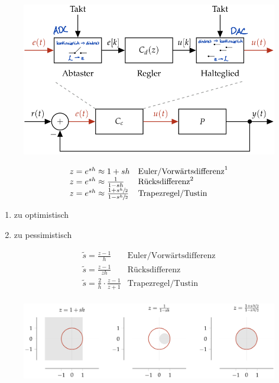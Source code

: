 \documentclass[
  10pt,
  a4paper,
  twocolumn]{article}
\providecommand{\tightlist}{%
  \setlength{\itemsep}{0pt}\setlength{\parskip}{0pt}}\usepackage{longtable,booktabs,array}
\numberwithin{equation}{section}
\begin{document}
\begin{figure}[H]

{\centering \includegraphics{images/paste-58.png}

}

\end{figure}

\[
\begin{array}{ll}
  z = e^{sh} \approx 1+sh & \text{Euler/Vorwärtsdifferenz}^1 \\
  z = e^{sh} \approx \frac1{1-sh} & \text{Rücksdifferenz}^2 \\
  z = e^{sh} \approx \frac{1+s\sfrac{h}{2}}{1-s\sfrac{h}{2}} & \text{Trapezregel/Tustin} \\
\end{array}
\]

\small

\begin{enumerate}
\def\labelenumi{\arabic{enumi}.}
\tightlist
\item
  zu optimistisch
\item
  zu pessimistisch
\end{enumerate}

\normalsize

\[
\begin{array}{ll}
  \widetilde{s} = \frac{z-1}{h} & \text{Euler/Vorwärtsdifferenz} \\
  \widetilde{s} = \frac{z-1}{zh} & \text{Rücksdifferenz} \\
  \widetilde{s} = \frac{2}{h}\cdot\frac{z-1}{z+1} & \text{Trapezregel/Tustin} \\
\end{array}
\]

\begin{figure}[H]

{\centering \includegraphics{images/paste-59.png}

}

\end{figure}
\end{document}
